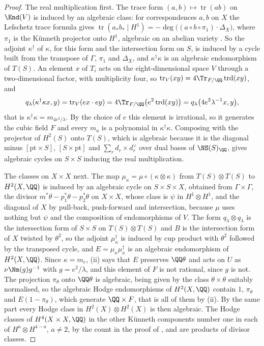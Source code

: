 \begin{proof}
The real multiplication first. The trace form $(a,b)\mapsto\operatorname{tr}(ab)$ on
$\End(V)$ is induced by an algebraic class: for correspondences $a,b$ on $X$
the Lefschetz trace formula gives
$\operatorname{tr}(a_{*}b_{*}\mid H^{1})=-\deg\bigl((a\circ b\circ\pi_{1})\cdot\Delta_{X}\bigr)$,
where $\pi_{1}$ is the K\"unneth projector onto $H^{1}$, algebraic on an
abelian variety \cite[\S2]{Kle68}. So the adjoint $\kappa^{\dagger}$ of
$\kappa$, for this form and the intersection form on $S$, is induced by a
cycle built from the transpose of $\Gamma$, $\pi_{1}$ and $\Delta_{X}$, and
$\kappa^{\dagger}\kappa$ is an algebraic endomorphism of $T(S)$. An element $x$ of $T_{i}$ acts on the
eight-dimensional space $V$ through a two-dimensional factor, with
multiplicity four, so $\operatorname{tr}_{V}(xy)=4\Tr_{F/\QQ}\operatorname{trd}(xy)$, and
\[
  q_{\lambda}(\kappa^{\dagger}\kappa x,y)
  =\operatorname{tr}_{V}(ex\cdot ey)
  =4\Tr_{F/\QQ}\bigl(e^{2}\operatorname{trd}(xy)\bigr)
  =q_{\lambda}\bigl(4e^{2}\lambda^{-1}x,y\bigr),
\]
that is $\kappa^{\dagger}\kappa=m_{4e^{2}/\lambda}$. By the choice of $e$ this
element is irrational, so it generates the cubic field $F$ and every $m_{a}$
is a polynomial in $\kappa^{\dagger}\kappa$. Composing with the projector of
$H^{2}(S)$ onto $T(S)$, which is algebraic because it is the diagonal minus
$[\mathrm{pt}\times S]$, $[S\times\mathrm{pt}]$ and $\sum_{r}d_{r}\times d_{r}^{\vee}$
over dual bases of $\NS(S)_{\QQ}$, gives algebraic cycles on $S\times S$
inducing the real multiplication.

The classes on $X\times X$ next. The map $\mu_{\kappa}=\mu\circ(\kappa\otimes\kappa)$
from $T(S)\otimes T(S)$ to $H^{2}(X,\QQ)$ is induced by an algebraic cycle on
$S\times S\times X$, obtained from $\Gamma\times\Gamma$, the divisor
$m^{*}\theta-p_{1}^{*}\theta-p_{2}^{*}\theta$ on $X\times X$, whose class is
$\psi$ in $H^{1}\otimes H^{1}$, and the diagonal of $X$ by pull-back,
push-forward and intersection, because $\mu$ uses nothing but $\psi$ and the
composition of endomorphisms of $V$.
The form $q_{\lambda}\otimes q_{\lambda}$ is the intersection form of
$S\times S$ on $T(S)\otimes T(S)$ and $B$ is the intersection form of $X$
twisted by $\theta^{2}$, so the adjoint $\mu_{\kappa}^{\dagger}$ is induced by
cup product with $\theta^{2}$ followed by the transposed cycle, and
$E=\mu_{\kappa}\mu_{\kappa}^{\dagger}$ is an algebraic endomorphism of
$H^{2}(X,\QQ)$. Since $\kappa=m_{e}$, (ii) says that $E$
preserves $\QQ\theta$ and acts on $U$ as $\nu\Nm(g)g^{-1}$ with
$g=e^{2}/\lambda$, and this element of $F$ is not rational, since $g$ is
not. The projection $\pi_{\theta}$ onto $\QQ\theta$ is algebraic, being
given by the class $\theta\times\theta$ suitably normalised, so the algebraic
Hodge endomorphisms of $H^{2}(X,\QQ)$ contain $1$, $\pi_{\theta}$ and
$E(1-\pi_{\theta})$, which generate $\QQ\times F$, that is all of them by
(ii). By the same part every Hodge class in
$H^{2}(X)\otimes H^{2}(X)$ is then algebraic. The Hodge classes of
$H^{4}(X\times X,\QQ)$ in the other K\"unneth components number one in each
of $H^{a}\otimes H^{4-a}$, $a\ne2$, by the count in the proof of
, and are products of divisor classes.
\end{proof}

